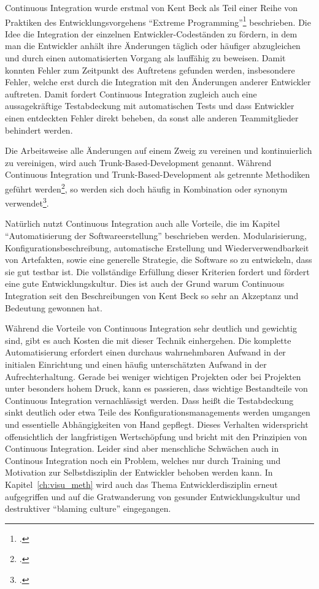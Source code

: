 Continuous Integration wurde erstmal von Kent Beck als Teil einer Reihe von Praktiken des Entwicklungsvorgehens ``Extreme Programming''\footcite{kent1999} beschrieben. Die Idee die Integration der einzelnen Entwickler-Codeständen zu fördern, in dem man die Entwickler anhält ihre Änderungen täglich oder häufiger abzugleichen und durch einen automatisierten Vorgang als lauffähig zu beweisen. Damit konnten Fehler zum Zeitpunkt des Auftretens gefunden werden, insbesondere Fehler, welche erst durch die Integration mit den Änderungen anderer Entwickler auftreten. Damit fordert Continuous Integration zugleich auch eine aussagekräftige Testabdeckung mit automatischen Tests und dass Entwickler einen entdeckten Fehler direkt beheben, da sonst alle anderen Teammitglieder behindert werden.

Die Arbeitsweise alle Änderungen auf einem Zweig zu vereinen und kontinuierlich zu vereinigen, wird auch Trunk-Based-Development genannt. Während Continuous Integration und Trunk-Based-Development als getrennte Methodiken geführt werden\footcite{trunkbaseddevelopment}, so werden sich doch häufig in Kombination oder synonym verwendet\footcite{fowler-feature-branch}.

Natürlich nutzt Continuous Integration auch alle Vorteile, die im Kapitel ``Automatisierung der Softwareerstellung'' beschrieben werden. Modularisierung, Konfigurationsbeschreibung, automatische Erstellung und Wiederverwendbarkeit von Artefakten, sowie eine generelle Strategie, die Software so zu entwickeln, dass sie gut testbar ist. Die vollständige Erfüllung dieser Kriterien fordert und fördert eine gute Entwicklungskultur. Dies ist auch der Grund warum Continuous Integration seit den Beschreibungen von Kent Beck so sehr an Akzeptanz und Bedeutung gewonnen hat.

Während die Vorteile von Continuous Integration sehr deutlich und gewichtig sind, gibt es auch Kosten die mit dieser Technik einhergehen. Die komplette Automatisierung erfordert einen durchaus wahrnehmbaren Aufwand in der initialen Einrichtung und einen häufig unterschätzten Aufwand in der Aufrechterhaltung. Gerade bei weniger wichtigen Projekten oder bei Projekten unter besonders hohem Druck, kann es passieren, dass wichtige Bestandteile von Continuous Integration vernachlässigt werden. Dass heißt die Testabdeckung sinkt deutlich oder etwa Teile des Konfigurationsmanagements werden umgangen und essentielle Abhängigkeiten von Hand gepflegt. Dieses Verhalten widerspricht offensichtlich der langfristigen Wertschöpfung und bricht mit den Prinzipien von Continuous Integration. Leider sind aber menschliche Schwächen auch in Continous Integration noch ein Problem, welches nur durch Training und Motivation zur Selbstdisziplin der Entwickler behoben werden kann. In Kapitel~\ref{ch:visu_meth} wird auch das Thema Entwicklerdisziplin erneut aufgegriffen und auf die Gratwanderung von gesunder Entwicklungskultur und destruktiver ``blaming culture'' eingegangen.

